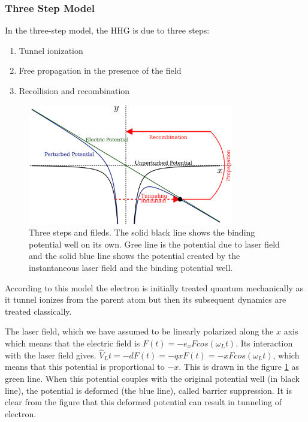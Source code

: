 \documentclass[12pt]{article}
\begin{document}
\subsubsection{Three Step Model}

In the three-step model, the HHG is due to three steps:
\begin{enumerate}
    \item Tunnel ionization
    \item Free propagation in the presence of the field
    \item Recollision and recombination
\end{enumerate}
\begin{figure}[h]
    \centering
    \includegraphics[width=0.8\textwidth]{images/three_step_one.png}
    \caption{Three steps and fileds. The solid black line shows the binding potential well on its own. Gree line is the potential due to laser field and the solid blue line shows the potential created by the instantaneous laser field and the binding potential well.  }
    \label{fig:3-step-1}
\end{figure}

According to this model the electron is initially treated quantum
mechanically as it tunnel ionizes from the parent atom but then its
subsequent dynamics are treated classically.

The laser field, which we have assumed to be linearly polarized along the $x$ axis which means that the electric field is \(F(t) = -e_xFcos(\omega_L t)\). Its interaction with the laser field gives. \(\hat V_L t=-dF(t) = -qxF(t)=-xFcos(\omega_Lt)\), which means that this potential is proportional to $-x$. This is drawn in the figure \ref{fig:3-step-1} as green line. When this potential couples with the original potential well (in black line), the potential is deformed (the blue line), called barrier suppression. It is clear from the figure that this deformed potential can result in tunneling of electron.
\end{document}
